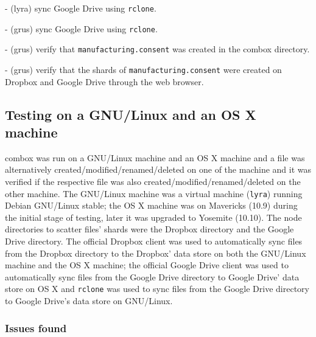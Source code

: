 - (lyra) sync Google Drive using \verb+rclone+.

- (grus) sync Google Drive using \verb+rclone+.

- (grus) verify that \verb+manufacturing.consent+ was created in the
combox directory.

- (grus) verify that the shards of \verb+manufacturing.consent+ were
created on Dropbox and Google Drive through the web browser.

\subsection{Testing on a GNU/Linux and an OS X machine}

combox was run on a GNU/Linux machine and an OS X machine and a file
was alternatively created/modified/renamed/deleted on one of the
machine and it was verified if the respective file was also
created/modified/renamed/deleted on the other machine. The GNU/Linux
machine was a virtual machine (\verb+lyra+) running Debian GNU/Linux
stable; the OS X machine was on Mavericks (10.9) during the initial
stage of testing, later it was upgraded to Yosemite (10.10). The node
directories to scatter files' shards were the Dropbox directory and
the Google Drive directory. The official Dropbox client was used to
automatically sync files from the Dropbox directory to the Dropbox'
data store on both the GNU/Linux machine and the OS X machine; the
official Google Drive client was used to automatically sync files from
the Google Drive directory to Google Drive' data store on OS X and
\verb+rclone+ \cite{program:rclone} was used to sync files from the
Google Drive directory to Google Drive's data store on GNU/Linux.

\subsubsection{Issues found}

